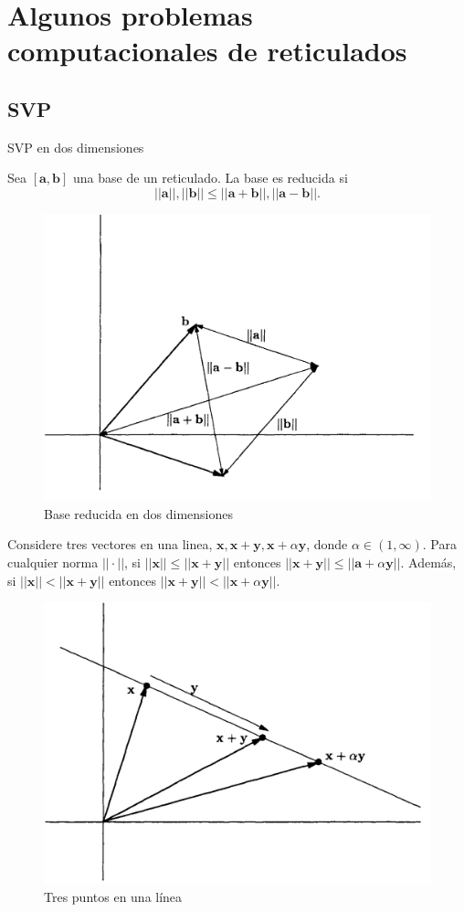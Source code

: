 \section{Algunos problemas computacionales de reticulados}

\subsection{SVP}
\begin{frame}{SVP en dos dimensiones}
    \begin{definition}
        Sea $[\textbf{a},\textbf{b}]$ una base de un reticulado. La base es reducida si
        \[
            ||\textbf{a}||,||\textbf{b}|| \leq ||\textbf{a}+\textbf{b}||,||\textbf{a}-\textbf{b}|| \text{.}
        \]
        \begin{figure}
            \centering
            \includegraphics[width=0.5\linewidth]{figures/baseReducida.png}
            \caption{Base reducida en dos dimensiones}
        \end{figure}
    \end{definition}
\end{frame}

\begin{frame}
    \begin{lemma}
        Considere tres vectores en una linea, $\textbf{x}, \textbf{x}+\textbf{y}, \textbf{x}+\textbf{$\alpha$} \textbf{y}$, donde $\alpha \in (1, \infty)$. Para cualquier norma $||\cdot||$, si $||\textbf{x}|| \leq ||\textbf{x}+\textbf{y}||$ entonces $||\textbf{x}+\textbf{y}|| \leq ||\textbf{a}+\alpha \textbf{y}||$. Además, si $||\textbf{x}||<||\textbf{x}+\textbf{y}||$ entonces $||\textbf{x}+\textbf{y}||<||\textbf{x}+\alpha \textbf{y}||$.
    \end{lemma}
    \begin{figure}
        \centering
        \includegraphics[width=0.45\linewidth]{figures/lattice_pointsLine.png}
        \caption{Tres puntos en una línea}
    \end{figure}
\end{frame}

